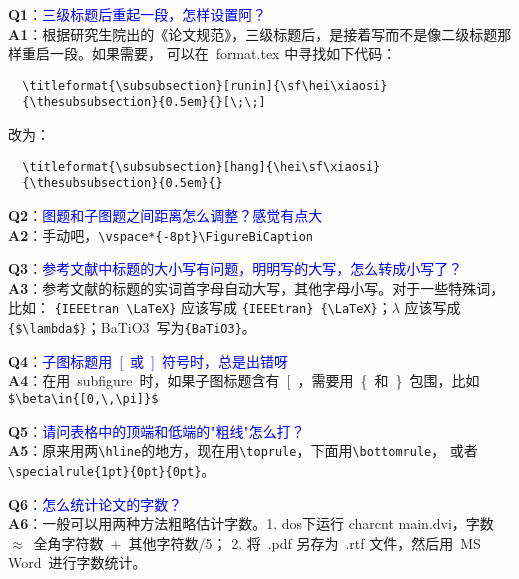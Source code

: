 \noindent \textbf{Q1}：\textcolor{blue}{三级标题后重起一段，怎样设置阿？}\\
\textbf{A1}：根据研究生院出的《论文规范》，三级标题后，是接着写而不是像二级标题那样重启一段。如果需要，
可以在~format.tex 中寻找如下代码：
\begin{verbatim}
  \titleformat{\subsubsection}[runin]{\sf\hei\xiaosi}
  {\thesubsubsection}{0.5em}{}[\;\;]
\end{verbatim}
改为：
\begin{verbatim}
  \titleformat{\subsubsection}[hang]{\hei\sf\xiaosi}
  {\thesubsubsection}{0.5em}{}
\end{verbatim}

\noindent \textbf{Q2}：\textcolor{blue}{图题和子图题之间距离怎么调整？感觉有点大}\\
\textbf{A2}：手动吧，\verb+\vspace*{-8pt}\FigureBiCaption+

\noindent \textbf{Q3}：\textcolor{blue}{参考文献中标题的大小写有问题，明明写的大写，怎么转成小写了？}\\
\textbf{A3}：参考文献的标题的实词首字母自动大写，其他字母小写。对于一些特殊词，比如：
\verb+{IEEEtran \LaTeX}+ 应该写成 \verb+{IEEEtran} {\LaTeX}+；$\lambda$ 应该写成
\verb+{$\lambda$}+；BaTiO3~写为\verb+{BaTiO3}+。

\noindent \textbf{Q4}：\textcolor{blue}{子图标题用~[~或~]~符号时，总是出错呀}\\
\textbf{A4}：在用~subfigure~时，如果子图标题含有~[~，需要用~\{~和~\}~包围，比如
\verb+$\beta\in{[0,\,\pi]}$+

\noindent \textbf{Q5}：\textcolor{blue}{请问表格中的顶端和低端的"粗线"怎么打？}\\
\textbf{A5}：原来用两\verb+\hline+的地方，现在用\verb+\toprule+，下面用\verb+\bottomrule+，
或者\verb+\specialrule{1pt}{0pt}{0pt}+。

\noindent \textbf{Q6}：\textcolor{blue}{怎么统计论文的字数？}\\
\textbf{A6}：一般可以用两种方法粗略估计字数。1. dos下运行 charcnt main.dvi，字数~$\approx$~全角字符数~+~其他字符数/5；
2. 将~.pdf 另存为~.rtf 文件，然后用~MS Word~进行字数统计。

